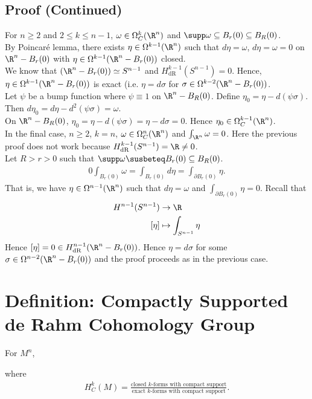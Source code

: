 \documentclass[11pt]{article}
\begin{document}
\subsection*{Proof (Continued)}
\label{sec:orgc5d7814}
For \(n\geq 2\) and \(2\leq k\leq n-1\), \(\omega\in\Omega^{k}_{C}(\R^{n})\) and \(\supp\omega\subseteq B_{r}(0)\subseteq B_{R}(0)\).\\
By Poincaré lemma, there exists \(\eta\in\Omega^{k-1}(\R^{n})\) such that \(d\eta=\omega\), \(d\eta=\omega=0\) on \(\R^{n}-B_{r}(0)\) with \(\eta\in\Omega^{k-1}(\R^{n}-B_{r}(0))\) closed.\\
We know that \((\R^{n}-B_{r}(0))\simeq S^{n-1}\) and \(H^{k-1}_{\text{dR}}(S^{n-1})=0\). Hence, \(\eta\in\Omega^{k-1}(\R^{n}-B_{r}(0))\) is exact (i.e. \(\eta=d\sigma\) for \(\sigma\in\Omega^{k-2}(\R^{n}-B_{r}(0))\).\\
Let \(\psi\) be a bump function where \(\psi\equiv 1\) on \(\R^{n}-B_{R}(0)\). Define \(\eta_{0}=\eta-d(\psi\sigma)\). Then \(d\eta_{0}=d\eta-d^{2}(\psi\sigma)=\omega\).\\
On \(\R^{n}-B_{R}(0)\), \(\eta_{0}=\eta-d(\psi\sigma)=\eta-d\sigma=0\). Hence \(\eta_{0}\in\Omega^{k-1}_{C}(\R^{n})\).\\
In the final case, \(n\geq 2\), \(k=n\), \(\omega\in\Omega_{C}^{n}(\R^{n})\) and \(\int_{\R^{n}}\omega=0\). Here the previous proof does not work because \(H^{k-1}_{\text{dR}}(S^{n-1})=\R\neq0\).\\
Let \(R>r>0\) such that \(\supp\omega\susbeteq B_{r}(0)\subseteq B_{R}(0)\).\\
\begin{align*}
  0
  \int_{B_{r}(0)}\omega
  =\int_{B_{r}(0)}d\eta
  =\int_{\partial B_{r}(0)}\eta.
\end{align*}
That is, we have \(\eta\in\Omega^{n-1}(\R^{n})\) such that \(d\eta=\omega\) and \(\int_{\partial B_{r}(0)}\eta=0\). Recall that\\
\begin{align*}
  H^{n-1}(S^{n-1}) &\to\R \\
  [\eta] &\mapsto\int_{S^{n-1}}\eta
\end{align*}
Hence \([\eta]=0\in H^{n-1}_{\text{dR}}(\R^{n}-B_{r}(0))\). Hence \(\eta=d\sigma\) for some \(\sigma\in\Omega^{n-2}(\R^{n}-B_{r}(0))\) and the proof proceeds as in the previous case.\\
\section*{Definition: Compactly Supported de Rahm Cohomology Group}
\label{sec:orgf8526de}
For \(M^{n}\),\\
where\\
\begin{align*}
  H^{k}_{C}(M)=
  \frac{\text{closed }k\text{-forms with compact support}}{\text{exact }k\text{-forms with compact support}}.
\end{align*}
\end{document}
